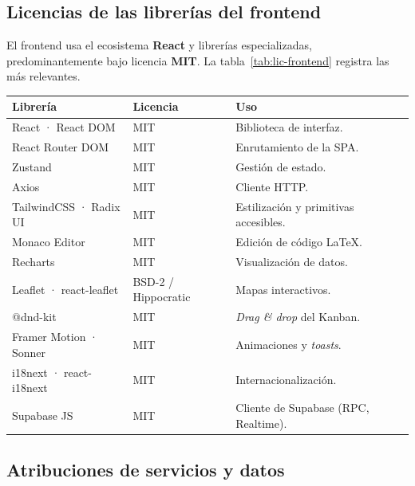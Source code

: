 \clearpage
\subsection{Licencias de las librerías del frontend}
\label{subsec:lic_frontend}

El frontend usa el ecosistema \textbf{React} y librerías especializadas, predominantemente
bajo licencia \textbf{MIT}. La tabla~\ref{tab:lic-frontend} registra las más relevantes.

\vspace{0.2cm}
\noindent
\renewcommand{\arraystretch}{1.25}
\fontsize{8}{9.6}\selectfont\sffamily
\begin{tabularx}{\textwidth}{|L{4.0cm}|C{1.8cm}|Y|}
\hline
{}
\sffamily\textbf{Librería} & \sffamily\textbf{Licencia} & \sffamily\textbf{Uso} \\
\hline
React · React DOM & MIT & Biblioteca de interfaz. \\ \hline
{}
React Router DOM & MIT & Enrutamiento de la SPA. \\ \hline
Zustand & MIT & Gestión de estado. \\ \hline
{}
Axios & MIT & Cliente HTTP. \\ \hline
TailwindCSS · Radix UI & MIT & Estilización y primitivas accesibles. \\ \hline
{}
Monaco Editor & MIT & Edición de código LaTeX. \\ \hline
Recharts & MIT & Visualización de datos. \\ \hline
{}
Leaflet · react-leaflet & BSD-2 / \scriptsize Hippocratic & Mapas interactivos. \\ \hline
@dnd-kit & MIT & \textit{Drag \& drop} del Kanban. \\ \hline
{}
Framer Motion · Sonner & MIT & Animaciones y \textit{toasts}. \\ \hline
i18next · react-i18next & MIT & Internacionalización. \\ \hline
{}
Supabase JS & MIT & Cliente de Supabase (RPC, Realtime). \\ \hline
\end{tabularx}
\label{tab:lic-frontend}

\subsection{Atribuciones de servicios y datos}
\label{subsec:atribuciones}


